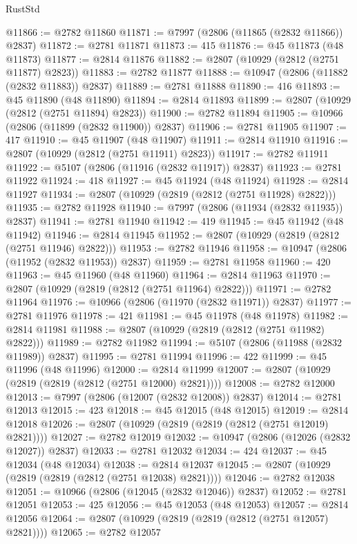 \begin{lexlean}{RustStd}
\begin{coremodule}
@11866 := @2782 @11860
@11871 := @7997 (@2806 (@11865 (@2832 @11866)) @2837)
@11872 := @2781 @11871
@11873 := 415
@11876 := @45 @11873 (@48 @11873)
@11877 := @2814 @11876
@11882 := @2807 (@10929 (@2812 (@2751 @11877) @2823))
@11883 := @2782 @11877
@11888 := @10947 (@2806 (@11882 (@2832 @11883)) @2837)
@11889 := @2781 @11888
@11890 := 416
@11893 := @45 @11890 (@48 @11890)
@11894 := @2814 @11893
@11899 := @2807 (@10929 (@2812 (@2751 @11894) @2823))
@11900 := @2782 @11894
@11905 := @10966 (@2806 (@11899 (@2832 @11900)) @2837)
@11906 := @2781 @11905
@11907 := 417
@11910 := @45 @11907 (@48 @11907)
@11911 := @2814 @11910
@11916 := @2807 (@10929 (@2812 (@2751 @11911) @2823))
@11917 := @2782 @11911
@11922 := @5107 (@2806 (@11916 (@2832 @11917)) @2837)
@11923 := @2781 @11922
@11924 := 418
@11927 := @45 @11924 (@48 @11924)
@11928 := @2814 @11927
@11934 := @2807 (@10929 (@2819 (@2812 (@2751 @11928) @2822)))
@11935 := @2782 @11928
@11940 := @7997 (@2806 (@11934 (@2832 @11935)) @2837)
@11941 := @2781 @11940
@11942 := 419
@11945 := @45 @11942 (@48 @11942)
@11946 := @2814 @11945
@11952 := @2807 (@10929 (@2819 (@2812 (@2751 @11946) @2822)))
@11953 := @2782 @11946
@11958 := @10947 (@2806 (@11952 (@2832 @11953)) @2837)
@11959 := @2781 @11958
@11960 := 420
@11963 := @45 @11960 (@48 @11960)
@11964 := @2814 @11963
@11970 := @2807 (@10929 (@2819 (@2812 (@2751 @11964) @2822)))
@11971 := @2782 @11964
@11976 := @10966 (@2806 (@11970 (@2832 @11971)) @2837)
@11977 := @2781 @11976
@11978 := 421
@11981 := @45 @11978 (@48 @11978)
@11982 := @2814 @11981
@11988 := @2807 (@10929 (@2819 (@2812 (@2751 @11982) @2822)))
@11989 := @2782 @11982
@11994 := @5107 (@2806 (@11988 (@2832 @11989)) @2837)
@11995 := @2781 @11994
@11996 := 422
@11999 := @45 @11996 (@48 @11996)
@12000 := @2814 @11999
@12007 := @2807 (@10929 (@2819 (@2819 (@2812 (@2751 @12000) @2821))))
@12008 := @2782 @12000
@12013 := @7997 (@2806 (@12007 (@2832 @12008)) @2837)
@12014 := @2781 @12013
@12015 := 423
@12018 := @45 @12015 (@48 @12015)
@12019 := @2814 @12018
@12026 := @2807 (@10929 (@2819 (@2819 (@2812 (@2751 @12019) @2821))))
@12027 := @2782 @12019
@12032 := @10947 (@2806 (@12026 (@2832 @12027)) @2837)
@12033 := @2781 @12032
@12034 := 424
@12037 := @45 @12034 (@48 @12034)
@12038 := @2814 @12037
@12045 := @2807 (@10929 (@2819 (@2819 (@2812 (@2751 @12038) @2821))))
@12046 := @2782 @12038
@12051 := @10966 (@2806 (@12045 (@2832 @12046)) @2837)
@12052 := @2781 @12051
@12053 := 425
@12056 := @45 @12053 (@48 @12053)
@12057 := @2814 @12056
@12064 := @2807 (@10929 (@2819 (@2819 (@2812 (@2751 @12057) @2821))))
@12065 := @2782 @12057

\end{coremodule}
\end{lexlean}

